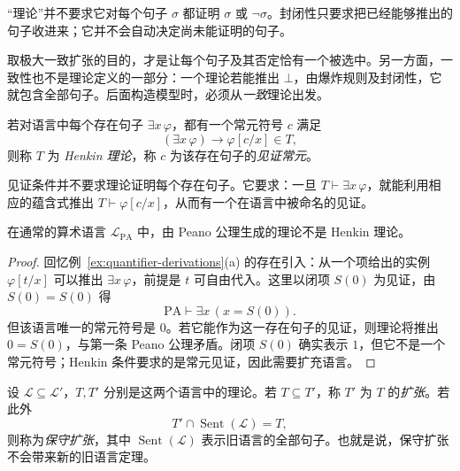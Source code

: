 \documentclass[lang=cn,a4paper,fontset=none,zihao=false,10pt,openany,twoside]{beautybook}
\numberwithin{algorithm}{chapter}
\begin{document}
\begin{remark}[推导封闭与决定句子]
“理论”并不要求它对每个句子 $\sigma$ 都证明 $\sigma$ 或 $\neg\sigma$。封闭性只要求把已经能够推出的句子收进来；它并不会自动决定尚未能证明的句子。

取极大一致扩张的目的，才是让每个句子及其否定恰有一个被选中。另一方面，一致性也不是理论定义的一部分：一个理论若能推出 $\bot$，由爆炸规则及封闭性，它就包含全部句子。后面构造模型时，必须从\emph{一致}理论出发。
\end{remark}

\begin{definition}[Henkin 理论]
若对语言中每个存在句子 $\exists x\,\varphi$，都有一个常元符号 $c$ 满足
\[
 (\exists x\,\varphi)\to\varphi[c/x]\in T,
\]
则称 $T$ 为 \emph{Henkin 理论}，称 $c$ 为该存在句子的\emph{见证常元}。
\end{definition}
见证条件并不要求理论证明每个存在句子。它要求：一旦 $T\vdash\exists x\,\varphi$，就能利用相应的蕴含式推出 $T\vdash\varphi[c/x]$，从而有一个在语言中被命名的见证。

\begin{example}
在通常的算术语言 $\mathcal L_{\mathrm{PA}}$ 中，由 Peano 公理生成的理论不是 Henkin 理论。
\end{example}
\begin{proof}
回忆例~\ref{ex:quantifier-derivations}(a) 的存在引入：从一个项给出的实例 $\varphi[t/x]$ 可以推出 $\exists x\,\varphi$，前提是 $t$ 可自由代入。这里以闭项 $S(0)$ 为见证，由 $S(0)=S(0)$ 得
\[
 \mathrm{PA}\vdash\exists x\,(x=S(0)).
\]
但该语言唯一的常元符号是 $0$。若它能作为这一存在句子的见证，则理论将推出 $0=S(0)$，与第一条 Peano 公理矛盾。闭项 $S(0)$ 确实表示 $1$，但它不是一个常元符号；Henkin 条件要求的是常元见证，因此需要扩充语言。
\end{proof}



\begin{definition}[保守扩张]
设 $\mathcal L\subseteq\mathcal L'$，$T,T'$ 分别是这两个语言中的理论。若 $T\subseteq T'$，称 $T'$ 为 $T$ 的\emph{扩张}。若此外
\[
 T'\cap\operatorname{Sent}(\mathcal L)=T,
\]
则称为\emph{保守扩张}，其中 $\operatorname{Sent}(\mathcal L)$ 表示旧语言的全部句子。也就是说，保守扩张不会带来新的旧语言定理。
\end{definition}
\end{document}
